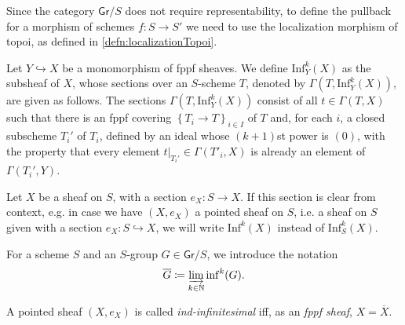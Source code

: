 \begin{rem}[]
	Since the category $\mathsf{Gr}/S$ does not require representability,
	to define the pullback for a morphism of schemes $f\colon S \to S'$
	we need to use the localization morphism of topoi, as defined in
	\cref{defn:localizationTopoi}.
\end{rem}


\begin{defn}\label{defn:kInfNeighbourhood}
	Let $Y \hookrightarrow X$ be a monomorphism of fppf sheaves.
	We define $\mathrm{Inf}_Y^k(X)$ as the subsheaf of $X$,
	whose sections over an $S$-scheme $T$, denoted by $\Gamma ( T , \mathrm{Inf}_Y^k(X) )$,
	are given as follows.
	The sections $\Gamma ( T , \mathrm{Inf}_Y^k(X) )$ consist of all
	$t \in \Gamma \left( T, X \right)$ such that
	there is an fppf covering $\left\{ T_{ i } \to T \right\}_{ i \in I }$
	of $T$ and, for each $i$, a closed subscheme $T_i'$ of $T_i$,
	defined by an ideal whose $(k+1)$st power is $(0)$,
	with the property that every element $\left.t\right|_{T_i'} \in \Gamma(T'_i, X)$
	is already an element of $\Gamma(T_i', Y)$.
\end{defn}


\begin{ntt}[]
	Let $X$ be a sheaf on $S$, with a section $e_X\colon S \to X$.
	If this section is clear from context, e.g. in case we have
	$(X, e_X)$ a pointed sheaf on $S$, i.e. a sheaf on $S$
	given with a section $e_X\colon S \hookrightarrow X$,
	we will write $\mathrm{Inf}^k(X)$
	instead of $\mathrm{Inf}_S^k(X)$.
\end{ntt}


\begin{ntt}\label{not:GBar}
	For a scheme $S$ and an $S$-group $G \in \mathsf{Gr}/S$, we introduce
	the notation 
	\begin{equation*}
	\overline{G} \coloneqq \varinjlim_{k \in \mathbb{N}} \mathrm{inf}^k(G)
	.\end{equation*}
\end{ntt} 


\begin{defn}
	A pointed sheaf $\left(X, e_X\right)$ is called {\em ind-infinitesimal} iff,
	as an {\em fppf sheaf}, $X = \overline{X}$.
\end{defn}


